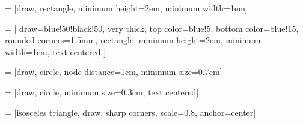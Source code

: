 
 = [draw, rectangle, minimum height=2em, minimum width=1em]

 = [
  draw=blue!50!black!50,
  very thick,
  top color=blue!5,
  bottom color=blue!15,
  rounded corners=1.5mm,
  rectangle,
  minimum height=2em,
  minimum width=1em,
  text centered
]

 = [draw, circle, node distance=1cm, minimum size=0.7cm]

 = [draw, circle, minimum size=0.3cm, text centered]

 = [isosceles triangle, draw, sharp corners, scale=0.8, anchor=center]
